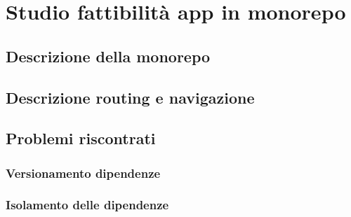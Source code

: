 \chapter{Studio fattibilità app in monorepo}
\label{chap:studio_fattibilita}

\section{Descrizione della monorepo}

\section{Descrizione routing e navigazione}

\section{Problemi riscontrati}

\subsection{Versionamento dipendenze}

\subsection{Isolamento delle dipendenze}


\newpage